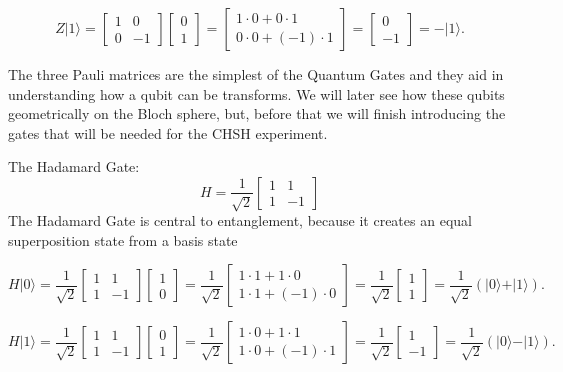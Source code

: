 \documentclass[12pt]{article}
\begin{document}
$$
Z \vert 1 \rangle = 
\begin{bmatrix} 1 & 0 \\ 0 & -1 \end{bmatrix}
\begin{bmatrix} 0 \\ 1 \end{bmatrix}
=
\begin{bmatrix} 1\cdot 0 + 0\cdot 1 \\ 0\cdot 0 + (-1)\cdot 1 \end{bmatrix}
=
\begin{bmatrix} 0 \\ -1 \end{bmatrix}
= -\vert 1 \rangle.
$$


The three Pauli matrices are the simplest of the Quantum Gates and they aid in understanding how a qubit can be transforms. We will later see how these qubits geometrically on the Bloch sphere, but, before that we will finish introducing the gates that will be needed for the CHSH experiment.

\vspace{1cm}

The Hadamard Gate:
$$
H = \frac{1}{\sqrt{2}}
\begin{bmatrix}
1 &  1 \\
1 & -1 
\end{bmatrix}
$$
The Hadamard Gate is central to entanglement, because it creates an equal superposition state from a basis state

$$
H \vert 0 \rangle = 
\frac{1}{\sqrt{2}} \begin{bmatrix} 1 & 1 \\ 1 & -1 \end{bmatrix}
\begin{bmatrix} 1 \\ 0 \end{bmatrix}
=
\frac{1}{\sqrt{2}} \begin{bmatrix} 1\cdot1 + 1\cdot0 \\ 1\cdot1 + (-1)\cdot0 \end{bmatrix}
=
\frac{1}{\sqrt{2}} \begin{bmatrix} 1 \\ 1 \end{bmatrix}
=
\frac{1}{\sqrt{2}} \left( \vert 0 \rangle + \vert 1 \rangle \right).
$$

$$
H \vert 1 \rangle = 
\frac{1}{\sqrt{2}} \begin{bmatrix} 1 & 1 \\ 1 & -1 \end{bmatrix}
\begin{bmatrix} 0 \\ 1 \end{bmatrix}
=
\frac{1}{\sqrt{2}} \begin{bmatrix} 1\cdot0 + 1\cdot1 \\ 1\cdot0 + (-1)\cdot1 \end{bmatrix}
=
\frac{1}{\sqrt{2}} \begin{bmatrix} 1 \\ -1 \end{bmatrix}
=
\frac{1}{\sqrt{2}} \left( \vert 0 \rangle - \vert 1 \rangle \right).
$$
\end{document}
